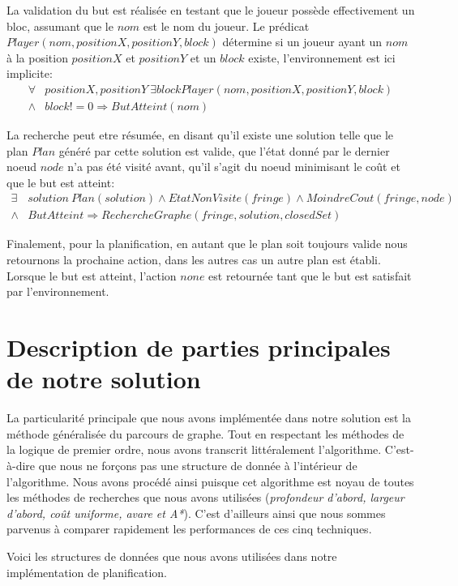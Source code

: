 \documentclass[12pt,english,frenchb,letterpaper]{article}
\begin{document}
La validation du but est réalisée en testant que le joueur possède effectivement un bloc, assumant que le $nom$ est le nom du joueur.  Le prédicat $Player(nom,positionX,positionY,block)$ détermine si un joueur ayant un $nom$ à la position $positionX$ et $positionY$ et un $block$ existe, l'environnement est ici implicite:
\begin{eqnarray*}
	\forall & positionX, positionY\ \exists block Player(nom,positionX,positionY, block) \\
	 \wedge & block != 0 \Rightarrow ButAtteint(nom)
\end{eqnarray*}

La recherche peut etre résumée, en disant qu'il existe une solution telle que le plan $Plan$ généré par cette solution est valide, que l'état donné par le dernier noeud $node$ n'a pas été visité avant, qu'il s'agit du noeud minimisant le coût et que le but est atteint:
\begin{eqnarray*}
	\exists & solution\ Plan(solution) \wedge EtatNonVisite(fringe) \wedge MoindreCout(fringe,node) \\  \wedge &  ButAtteint \Rightarrow RechercheGraphe(fringe, solution, closedSet)
\end{eqnarray*}

Finalement, pour la planification, en autant que le plan soit toujours valide nous retournons la prochaine action, dans les autres cas un autre plan est établi.  Lorsque le but est atteint, l'action $none$ est retournée tant que le but est satisfait par l'environnement.


\section{Description de parties principales de notre solution}
La particularité principale que nous avons implémentée dans notre solution est la méthode généralisée du parcours de graphe. Tout en respectant les méthodes de la logique de premier ordre, nous avons transcrit littéralement l'algorithme. C'est-à-dire que nous ne forçons pas une structure de donnée à l'intérieur de l'algorithme. Nous avons procédé ainsi puisque cet algorithme est noyau de toutes les méthodes de recherches que nous avons utilisées (\textit{profondeur d'abord, largeur d'abord, coût uniforme, avare et A*}). C'est d'ailleurs ainsi que nous sommes parvenus à comparer rapidement les performances de ces cinq techniques.

Voici les structures de données que nous avons utilisées dans notre implémentation de planification.
\end{document}
